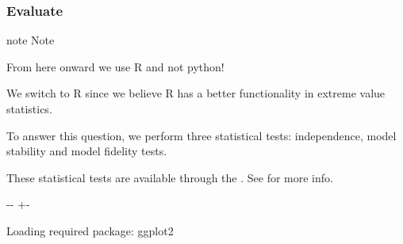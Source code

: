 \documentclass[letterpaper,10pt,english]{sphinxmanual}
\newlength\nbsphinxcodecellspacing
\begin{document}
\subsubsection{Evaluate}
\label{\detokenize{Notebooks/examples/Siberian_Heatwave:Evaluate}}
\begin{sphinxadmonition}{note}{}\unskip
Note

From here onward we use R and not python!

We switch to R since we believe R has a better functionality in extreme value statistics.
\end{sphinxadmonition}


\begin{DUlineblock}{0em}
\item[] To answer this question, we perform three statistical tests: independence, model stability and model fidelity tests.
\item[] These statistical tests are available through the . See {\hyperref[\detokenize{Notebooks/3.Evaluate/3.Evaluate::doc}]{}} for more info.
\end{DUlineblock}

{
\begin{sphinxVerbatim}[commandchars=\\\{\}]
\llap{\color{nbsphinxin}[12]:\,\hspace{\fboxrule}\hspace{\fboxsep}}
\end{sphinxVerbatim}
}

{

\kern-\sphinxverbatimsmallskipamount\kern-\baselineskip
\kern+\FrameHeightAdjust\kern-\fboxrule
\vspace{\nbsphinxcodecellspacing}

\begin{sphinxVerbatim}[commandchars=\\\{\}]
Loading required package: ggplot2

\end{sphinxVerbatim}
}
\end{document}
